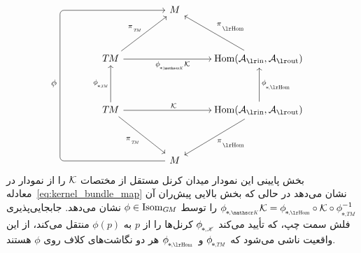 \begin{equation}
    \begin{tikzcd}[row sep=3.5em, column sep=2.8em]
        &[3.5ex] M & \\
        \TM  \arrow[ru, "\piTM"]
            \arrow[rr, pos=.56, "\dphiK \K"']
        & &
        \mkern-3mu
        \Hom(\Ain,\Aout)
            \arrow[lu, "\piHom"']
        \\
        \TM  \arrow[rd, "\piTM"']
            \arrow[rr, pos=.57, "\K"]
            \arrow[u, "\dphiTM"]
        & &
        \mkern-3mu
        \Hom(\Ain,\Aout)
            \arrow[ld, "\piHom"]
            \arrow[u, "\dphiHom"']
        \\
        & M 
            \arrow[uuu, rounded corners, to path={ 
                    -- ([xshift=-25ex]\tikztostart.west) 
                    --node[left, pos=.515]{\small$\phi$} ([xshift=-25ex]\tikztotarget.west) 
                    -- (\tikztotarget.west)
                    }]
        &
    \end{tikzcd}
    \quad
\end{equation}
بخش پایینی این نمودار میدان کرنل مستقل از مختصات $\mathcal{K}$ را از نمودار در معادله~\eqref{eq:kernel_bundle_map} نشان می‌دهد در حالی که بخش بالایی پیش‌ران آن $\dphiK \K = \dphiHom \!\circ \K \circ \dphiTMinv$ را توسط $\phi \in \operatorname{Isom}_{G\mkern-1.4muM}$ نشان می‌دهد.
جابجایی‌پذیری فلش سمت چپ، که تأیید می‌کند $\dphiK$ کرنل‌ها را از $p$ به $\phi(p)$ منتقل می‌کند، از این واقعیت ناشی می‌شود که $\dphiTM$ و $\dphiHom$ هر دو نگاشت‌های کلاف روی $\phi$ هستند.


